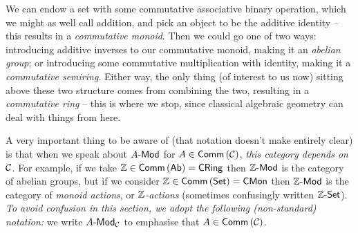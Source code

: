 
        We can endow a set with some commutative associative binary operation, which we might as well call addition, and pick an object to be the additive identity -- this results in a \emph{commutative monoid}.
        Then we could go one of two ways: introducing additive inverses to our commutative monoid, making it an \emph{abelian group}; or introducing some commutative multiplication with identity, making it a \emph{commutative semi\-ring}.
        Either way, the only thing (of interest to us now) sitting above these two structure comes from combining the two, resulting in a \emph{commutative ring} -- this is where we stop, since classical algebraic geometry can deal with things from here.

        \begin{note}
            A very important thing to be aware of (that notation doesn't make entirely clear) is that when we speak about ${{A}\hbox{-}\mathsf{Mod}}$ for $A\in\mathsf{Comm}\left({\mathcal{C}}\right)$, \emph{this category depends on $\mathcal{C}$}.
            For example, if we take $\mathbb{Z}\in\mathsf{Comm}\left({\mathsf{Ab}}\right)=\mathsf{CRing}$ then ${{\mathbb{Z}}\hbox{-}\mathsf{Mod}}$ is the category of abelian groups, but if we consider \mbox{$\mathbb{Z}\in\mathsf{Comm}\left({\mathsf{Set}}\right)=\mathsf{CMon}$} then ${{\mathbb{Z}}\hbox{-}\mathsf{Mod}}$ is the category of \emph{monoid actions}, or \emph{$\mathbb{Z}$-actions} (sometimes confusingly written $\mathbb{Z}\hbox{-}\mathsf{Set}$).
            \emph{To avoid confusion in this section, we adopt the following (non-standard) notation:} we write ${{A}\hbox{-}\mathsf{Mod}}_{\mathcal{C}}$ to emphasise that \mbox{$A\in\mathsf{Comm}\left({\mathcal{C}}\right)$}.
        \end{note}

